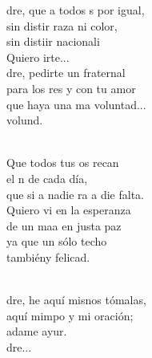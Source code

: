 \begin{cancion}%
	dre, que a todos s por igual,\\
	sin distir raza ni color,\\
	sin distiir nacionali\\
	Quiero irte...\\
	dre, pedirte un fraternal \\
	para los res y con tu amor\\
	que haya una ma voluntad...\\
	 volund. \\\jump\\
	\begin{chorus}%
	Que todos tus os recan\\
	el n de cada día,\\
	que si a nadie ra a die falta. \\
	Quiero vi en la esperanza\\
	de un maa en justa paz\\
	ya que  un sólo techo\\
	tambiény felicad.\\
	\end{chorus}%
	\jump\\
	dre, he aquí misnos tómalas,\\
	aquí mimpo y mi oración;\\
	adame ayur.  \\
	dre...\\
\end{cancion}%
